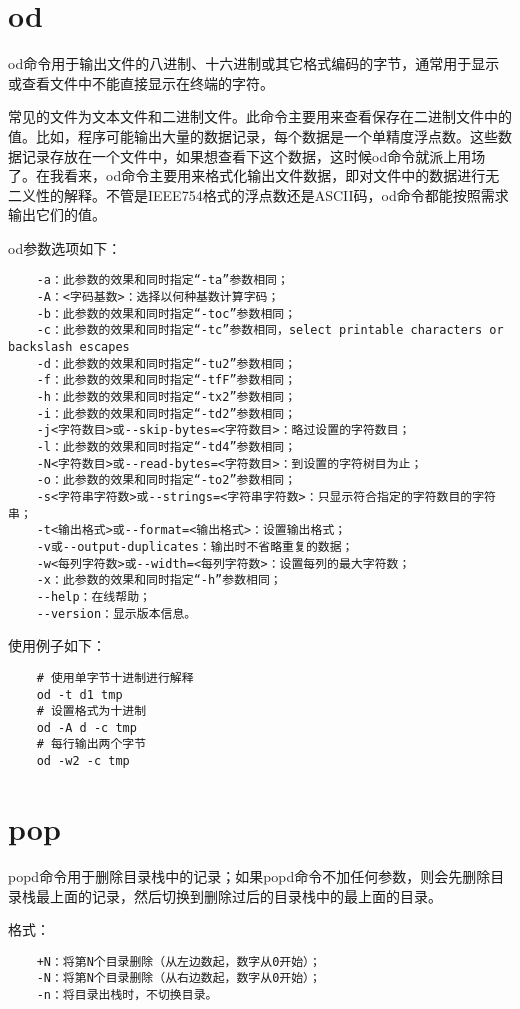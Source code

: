 \documentclass[a4paper,left=2.5cm,right=2.5cm,11pt]{article}
\begin{document}
\section{od}
	od命令用于输出文件的八进制、十六进制或其它格式编码的字节，通常用于显示或查看文件中不能直接显示在终端的字符。\par
	常见的文件为文本文件和二进制文件。此命令主要用来查看保存在二进制文件中的值。比如，程序可能输出大量的数据记录，每个数据是一个单精度浮点数。这些数据记录存放在一个文件中，如果想查看下这个数据，这时候od命令就派上用场了。在我看来，od命令主要用来格式化输出文件数据，即对文件中的数据进行无二义性的解释。不管是IEEE754格式的浮点数还是ASCII码，od命令都能按照需求输出它们的值。\par

	od参数选项如下：
	\begin{lstlisting}
	-a：此参数的效果和同时指定“-ta”参数相同； 
	-A：<字码基数>：选择以何种基数计算字码； 
	-b：此参数的效果和同时指定“-toc”参数相同； 
	-c：此参数的效果和同时指定“-tc”参数相同，select printable characters or backslash escapes 
	-d：此参数的效果和同时指定“-tu2”参数相同； 
	-f：此参数的效果和同时指定“-tfF”参数相同； 
	-h：此参数的效果和同时指定“-tx2”参数相同； 
	-i：此参数的效果和同时指定“-td2”参数相同； 
	-j<字符数目>或--skip-bytes=<字符数目>：略过设置的字符数目； 
	-l：此参数的效果和同时指定“-td4”参数相同； 
	-N<字符数目>或--read-bytes=<字符数目>：到设置的字符树目为止； 
	-o：此参数的效果和同时指定“-to2”参数相同； 
	-s<字符串字符数>或--strings=<字符串字符数>：只显示符合指定的字符数目的字符串； 
	-t<输出格式>或--format=<输出格式>：设置输出格式； 
	-v或--output-duplicates：输出时不省略重复的数据； 
	-w<每列字符数>或--width=<每列字符数>：设置每列的最大字符数； 
	-x：此参数的效果和同时指定“-h”参数相同； 
	--help：在线帮助； 
	--version：显示版本信息。
	\end{lstlisting}

	使用例子如下：
	\begin{lstlisting}
	# 使用单字节十进制进行解释
	od -t d1 tmp
	# 设置格式为十进制
	od -A d -c tmp
	# 每行输出两个字节
	od -w2 -c tmp
	\end{lstlisting}

\section{pop}
	popd命令用于删除目录栈中的记录；如果popd命令不加任何参数，则会先删除目录栈最上面的记录，然后切换到删除过后的目录栈中的最上面的目录。\par

	格式：
	\begin{lstlisting}
	+N：将第N个目录删除（从左边数起，数字从0开始）； 
	-N：将第N个目录删除（从右边数起，数字从0开始）； 
	-n：将目录出栈时，不切换目录。
	\end{lstlisting}
\end{document}
